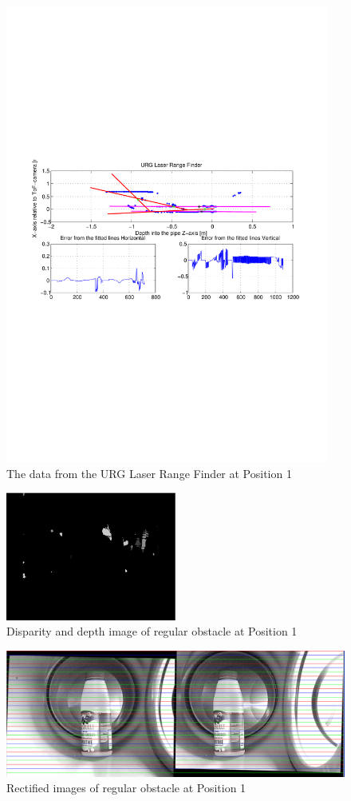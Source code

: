 \begin{figure}[htbp]
    \centering
    \includegraphics[width=0.95\textwidth]{pics/pos1-regular-urg-2d}
    \caption{The data from the URG Laser Range Finder at Position 1}
    \label{chap7:fig-pos1-regular-urg-2d}
\end{figure}
\begin{figure}[htbp]
    \centering
    \includegraphics[width=0.5\textwidth]{pics/pos1-regular-depth}
    \caption{Disparity and depth image of regular obstacle at Position 1}
    \label{chap7:fig-pos1-regular-depth}
\end{figure}
\begin{figure}[htbp]
    \centering
    \includegraphics[width=\textwidth]{pics/pos1-regular-rectified}
    \caption{Rectified images of regular obstacle at Position 1}
    \label{chap7:fig-pos1-regular-rectified}
\end{figure}

